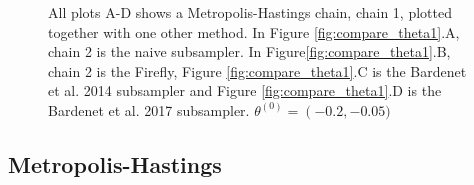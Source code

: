 \begin{figure}
    \caption{All plots A-D shows a Metropolis-Hastings chain, chain 1, plotted together with one other method. In Figure \ref{fig:compare_theta1}.A, chain 2 is the naive subsampler. In Figure\ref{fig:compare_theta1}.B, chain 2 is the Firefly, Figure \ref{fig:compare_theta1}.C is the Bardenet et al. 2014 subsampler and Figure \ref{fig:compare_theta1}.D is the Bardenet et al. 2017 subsampler. $\theta
   ^{\left(0\right)} = \left(-0.2, -0.05)$}%
    \label{fig:compare_theta1_normal}%
\end{figure}


\subsection*{Metropolis-Hastings}\label{subsec:mh_sim}
